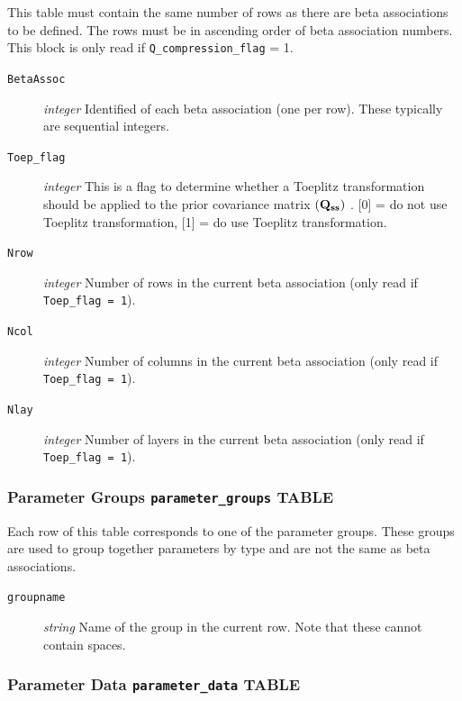 \documentclass[11pt,oneside,onecolumn]{usgsreport}
\begin{document}
\begin{appendix}
This table must contain the same number of rows as there are beta
associations to be defined. The rows must be in ascending order of
beta association numbers. This block is only read if \texttt{Q\_compression\_flag}
= 1.
\begin{description}
\item [{\texttt{BetaAssoc}}] \emph{integer }Identified of each beta association
(one per row). These typically are sequential integers.
\item [{\texttt{Toep\_flag}}] \emph{integer} This is a flag to determine
whether a Toeplitz transformation should be applied to the prior covariance
matrix $\mbox{\ensuremath{\left(\mathbf{Q_{ss}}\right)} }$. {[}0{]}
= do not use Toeplitz transformation, {[}1{]} = do use Toeplitz transformation.
\item [{\texttt{Nrow}}] \emph{integer }Number of rows in the current beta
association (only read if \texttt{Toep\_flag = 1}).
\item [{\texttt{Ncol}}] \emph{integer }Number of columns in the current
beta association (only read if \texttt{Toep\_flag = 1}).
\item [{\texttt{Nlay}}] \emph{integer }Number of layers in the current
beta association (only read if \texttt{Toep\_flag = 1}).
\end{description}

\subsubsection{Parameter Groups \texttt{parameter\_groups} TABLE}

Each row of this table corresponds to one of the parameter groups.
These groups are used to group together parameters by type and are
not the same as beta associations.
\begin{description}
\item [{\texttt{groupname}}] \emph{string} Name of the group in the current
row. Note that these cannot contain spaces.
\end{description}

\subsubsection{Parameter Data \texttt{parameter\_data} TABLE}


\end{appendix}
\end{document}
